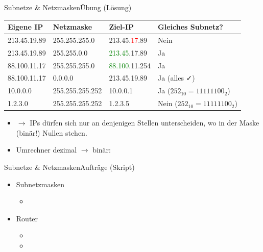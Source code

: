 \begin{frame}[fragile]{Subnetze \& Netzmasken}{Übung (Lösung)}
\begin{table}[H]
\centering
\footnotesize
\begin{tabular}{l|l|l|p{2cm}}

\textbf{Eigene IP} & \textbf{Netzmaske} & \textbf{Ziel-IP} & \textbf{Gleiches \newline Subnetz?} \\\midrule\midrule

213.45.19.89 & 255.255.255.0 & 213.45.\textcolor{red}{17}.89 & Nein \\\midrule

213.45.19.89 & 255.255.0.0 & \textcolor{green}{213.45}.17.89 &  Ja \\\midrule

88.100.11.17 & 255.255.255.0 & \textcolor{green}{88.100}.11.254 & Ja \\\midrule

88.100.11.17 & 0.0.0.0 & 213.45.19.89 &  Ja (alles \faCheck)\\\midrule

10.0.0.0 & 255.255.255.252 & 10.0.0.1 & Ja ($252_{10}=11111100_{2}$) \\\midrule
1.2.3.0 & 255.255.255.252 & 1.2.3.5 & Nein ($252_{10}=11111100_{2}$)
\end{tabular}
\end{table}
\begin{itemize}
\item $\rightarrow$ IPs dürfen sich nur an denjenigen Stellen unterscheiden, wo in der Maske (binär!) Nullen stehen. 
\item Umrechner dezimal $\rightarrow$ binär: 
\end{itemize}
\end{frame}

\begin{frame}[fragile]{Subnetze \& Netzmasken}{Aufträge (Skript)}
\begin{itemize}
\item Subnetzmasken
\begin{itemize}
\item {}
\end{itemize}
\item Router
\begin{itemize}
\item {}
\item {}
\end{itemize}
\end{itemize}
\end{frame}

